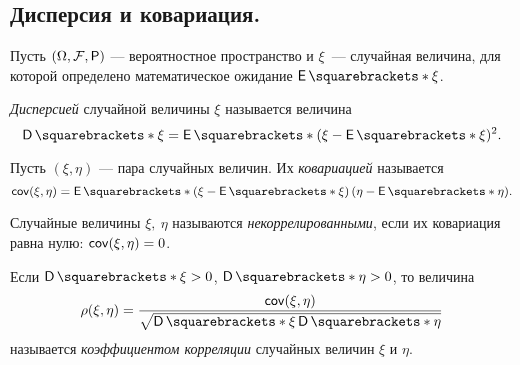 \subsection{Дисперсия и ковариация.}
Пусть \((\Omega, \F, \Pr)\) --- вероятностное пространство и \(\xi\)~--- случайная величина, для которой определено математическое ожидание \(\E{\xi}\).
\begin{definition}
	\emph{Дисперсией} случайной величины \(\xi\) называется величина \[\D{\xi}=\E{(\xi - \E{\xi})^2}.\]
\end{definition}
\begin{definition}
	Пусть \((\xi, \eta)\) --- пара случайных величин. Их \emph{ковариацией} называется \[\cov(\xi, \eta) = \E{\left(\xi - \E{\xi}\right)\left(\eta - \E{\eta}\right)}.\]
\end{definition}
\begin{definition}
	Случайные величины \(\xi,\ \eta \) называются \emph{некоррелированными}, если их ковариация равна нулю: \(\operatorname{\mathsf{cov}}(\xi, \eta) = 0\).
\end{definition}
\begin{definition}
	Если \(\D{\xi} > 0\), \(\D{\eta} > 0\), то величина \[\rho(\xi, \eta) = \frac{\cov(\xi, \eta)}{\sqrt{\D{\xi}\D{\eta}}}\] называется \emph{коэффициентом корреляции} случайных величин $ \xi $ и $ \eta $.
\end{definition}

